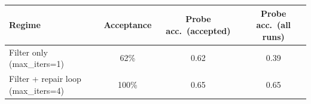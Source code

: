 \begin{tabular}{lccc}
\toprule
Regime & Acceptance & Probe acc.\ (accepted) & Probe acc.\ (all runs) \\
\midrule
Filter only (max\_iters=1) & 62\% & 0.62 & 0.39 \\
Filter + repair loop (max\_iters=4) & 100\% & 0.65 & 0.65 \\
\bottomrule
\end{tabular}
